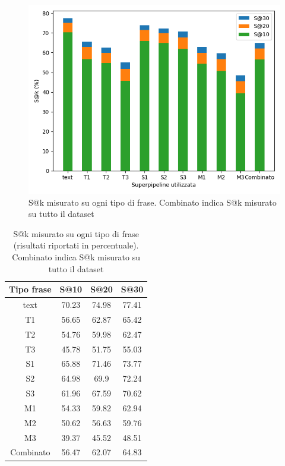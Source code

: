 \begin{figure}[H]
\centering
\includegraphics[width=\textwidth]{immagini/analisi/overview}
\caption{S@k misurato su ogni tipo di frase. Combinato indica S@k misurato su tutto il dataset}
\label{fig:ana_s@k}
\end{figure}


\begin{table}[H]
\centering
\begin{tabular}{cccc}
\textbf{Tipo frase} & \textbf{S@10} & \textbf{S@20} & \textbf{S@30} \\ \hline
text& 70.23& 74.98& 77.41\\
T1& 56.65& 62.87& 65.42\\
T2& 54.76& 59.98& 62.47\\
T3& 45.78& 51.75& 55.03\\
S1& 65.88& 71.46& 73.77\\
S2& 64.98& 69.9& 72.24\\
S3& 61.96& 67.59& 70.62\\
M1& 54.33& 59.82& 62.94\\
M2& 50.62& 56.63& 59.76\\
M3& 39.37& 45.52& 48.51\\
Combinato& 56.47& 62.07& 64.83\\
\end{tabular}
\caption{S@k misurato su ogni tipo di frase (risultati riportati in percentuale). Combinato indica S@k misurato su tutto il dataset}
\label{tab:ana_s@k}
\end{table}

